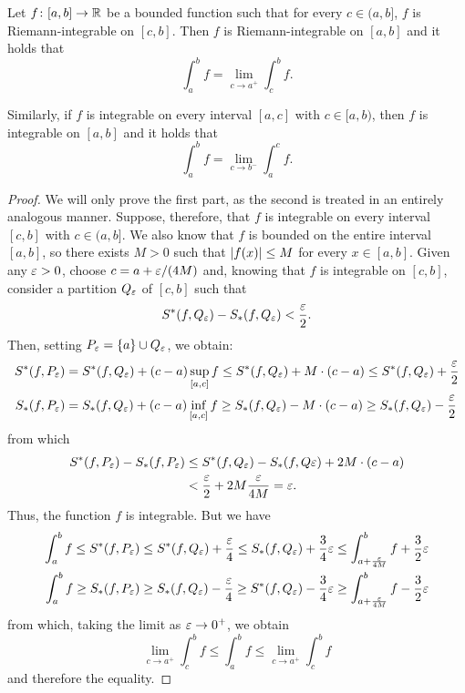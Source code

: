 \begin{theorem}
\label{th:integrale_continuo}
Let $f\colon [a,b]\to {\mathbb R}$ be a bounded function such
that for every $c\in (a,b]$, $f$ is Riemann-integrable
on $[c,b]$. Then $f$ is Riemann-integrable on $[a,b]$ and it holds that
\[
  \int_a^b f = \lim_{c\to a^+} \int_c^b f.
\]

Similarly, if $f$ is integrable on every interval $[a,c]$
with $c\in [a,b)$, then $f$ is integrable on $[a,b]$ and it holds that
\[
  \int_a^b f = \lim_{c\to b^-} \int_a^c f.
\]
\end{theorem}
%
\begin{proof}
We will only prove the first part, as the second is treated
in an entirely analogous manner. Suppose, therefore, that $f$ is integrable on
every
interval $[c,b]$ with $c\in (a,b]$. We also know that $f$ is bounded on
the entire interval $[a,b]$, so there exists $M>0$ such that ${\left|f(x)\right|}\le M$
for every
$x\in [a,b]$. Given any $\varepsilon>0$,
choose $c = a + \varepsilon/(4M)$ and, knowing that $f$ is integrable on $[c,b]$,
consider a partition $Q_\varepsilon$ of $[c,b]$ such that
\[
  S^*(f, Q_\varepsilon) - S_*(f, Q_\varepsilon) < \frac {\varepsilon} 2.
\]
Then, setting $P_\varepsilon = {\left\{ a \right\}} \cup Q_\varepsilon$, we obtain:
\begin{align*}
  S^*(f,P_\varepsilon) &= S^*(f,Q_\varepsilon) + (c-a)\sup_{[a,c]} f
    \le S^*(f,Q_\varepsilon) + M \cdot (c-a) \le S^*(f,Q_\varepsilon) + \frac {\varepsilon} 2\\
  S_*(f,P_\varepsilon) &= S_*(f,Q_\varepsilon) + (c-a)\inf_{[a,c]} f
    \ge S_*(f,Q_\varepsilon) - M \cdot (c-a) \ge S_*(f,Q_\varepsilon) - \frac {\varepsilon} 2
\end{align*}
from which
\begin{align*}
  S^*(f,P_\varepsilon)-S_*(f,P_\varepsilon)
  &\le S^*(f,Q_\varepsilon) - S_*(f,Q\varepsilon) + 2 M \cdot (c-a)\\
  &< \frac{\varepsilon}{2} + 2 M \frac{\varepsilon}{4M}
  = \varepsilon.
\end{align*}
Thus, the function $f$ is integrable. But we have
\begin{align*}
\int_a^b f \le S^*(f,P_\varepsilon) \le S^*(f,Q_\varepsilon) + \frac{\varepsilon}{4}
\le S_*(f,Q_\varepsilon) + \frac 3 4 \varepsilon
\le \int_{a+\frac {\varepsilon}{4M}}^b f + \frac {3}{2} \varepsilon \\
\int_a^b f \ge S_*(f,P_\varepsilon) \ge S_*(f,Q_\varepsilon) - \frac{\varepsilon}{4}
\ge S^*(f,Q_\varepsilon) - \frac 3 4 \varepsilon
\ge \int_{a+\frac {\varepsilon}{4M}}^b f - \frac {3}{2} \varepsilon
\end{align*}
from which, taking the limit as $\varepsilon \to 0^+$, we obtain
\[
  \lim_{c\to a^+} \int_c^b f \le \int_a^b f \le \lim_{c\to a^+} \int_c^b f
\]
and therefore the equality.
\end{proof}

